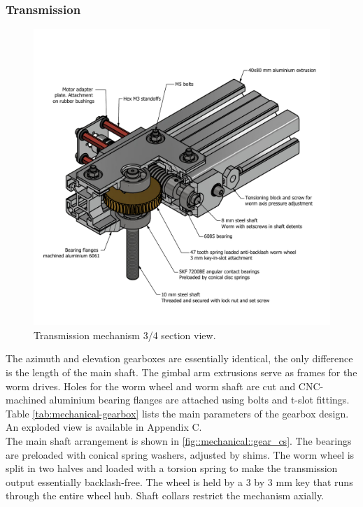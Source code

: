 \subsubsection{Transmission}
\begin{figure}[H]
	\centering 
	\includegraphics[width=\textwidth]{4-experiment-design/img/mechanical/transmission.pdf}
	\caption{Transmission mechanism 3/4 section view. }
	\label{fig::mechanical::transmission}
\end{figure}

The azimuth and elevation gearboxes are essentially identical, the only difference is the length of the main shaft. The gimbal arm extrusions serve as frames for the worm drives. Holes for the worm wheel and worm shaft are cut and CNC-machined aluminium bearing flanges are attached using bolts and t-slot fittings. Table \ref{tab:mechanical-gearbox} lists the main parameters of the gearbox design. An exploded view is available in Appendix C. \\


The main shaft arrangement is shown in \ref{fig::mechanical::gear_cs}. The bearings are preloaded with conical spring washers, adjusted by shims. The worm wheel is split in two halves and loaded with a torsion spring to make the transmission output essentially backlash-free. The wheel is held by a 3 by 3 mm key that runs through the entire wheel hub. Shaft collars restrict the mechanism axially.

